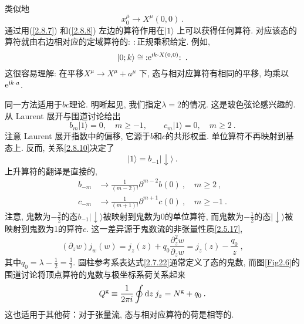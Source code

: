 类似地
\begin{equation}\label{2.8.8}
x_{0}^{\mu} \rightarrow X^{\mu}(0,0) \:.
\end{equation}
通过用(\ref{2.8.7}) 和(\ref{2.8.8}) 左边的算符作用在$|1\rangle$ 上可以获得任何算符. 
对应该态的算符就由右边相对应的定域算符的$\mathrel{:\::}$正规乘积给定. 例如,
\begin{equation}
\lvert 0 ; k\rangle \cong \: : \mathrel{\mathrm{e}^{\mathrm{i} k \cdot X(0,0)}}: \:. \label{2.8.9}
\end{equation}
这很容易理解: 在平移$X^{\mu} \rightarrow X^{\mu}+a^{\mu}$ 下, 态与相对应算符有相同的平移, 均乘以$\mathrm{e} ^{\mathrm{i} k\cdot a}$. 

同一方法适用于$bc$理论. 明晰起见, 我们指定$\lambda=2$的情况. 这是玻色弦论感兴趣的. 从 Laurent 展开与围道讨论给出
\begin{equation}\label{2.8.10}
b_{m}|1\rangle=0, \quad m \geq-1, \qquad c_{m}|1\rangle=0, \quad m \geq 2 \:.
\end{equation}
注意 Laurent 展开指数中的偏移, 它源于$b$和$c$的共形权重. 单位算符不再映射到基态上. 反而, 关系\eqref{2.8.10}决定了
\begin{equation}
\lvert 1\rangle=b_{-1}\lvert \downarrow\rangle \:. \label{2.8.11}
\end{equation}
上升算符的翻译是直接的,
\begin{subequations} \label{2.8.12}
\begin{align}
b_{-m} &\rightarrow \frac{1}{(m-2) !} \partial^{m-2} b(0)\:, \quad m \geq 2 \:, \label{2.8.12a}  \\
c_{-m} &\rightarrow \frac{1}{(m+1) !} \partial^{m+1} c(0)\:, \quad m \geq-1 \:. \label{2.8.12b}
\end{align}
\end{subequations}
注意, 鬼数为$-\frac{3}{2}$的态$b_{-1}\lvert \downarrow\rangle$被映射到鬼数为0的单位算符, 而鬼数为$-\frac{1}{2}$的态$\lvert \downarrow\rangle$被映射到鬼数为1的算符$c$. 这一差异源于鬼数流的非张量性质\eqref{2.5.17},
\begin{equation}
(\partial_{z} w) j_{w}(w)=j_{z}(z)+q_{0} \frac{\partial_{z}^{2} w}{\partial_{z} w}=j_{z}(z)-\frac{q_{0}}{z} \:, \label{2.8.13}
\end{equation}
其中$q_{0}=\lambda-\frac{1}{2}=\frac{3}{2}$. 圆柱参考系表达式\eqref{2.7.22}通常定义了态的鬼数, 而图\ref{Fig2.6}的围道讨论将顶点算符的鬼数与极坐标系荷关系起来
\begin{equation}
Q^{\mathrm{g}} \equiv \frac{1}{2 \pi i} \oint \mathrm{d} z\: j_{z}=N^{\mathrm{g}}+q_{0} \:.\label{2.8.14}
\end{equation}
这也适用于其他荷：对于张量流, 态与相对应算符的荷是相等的.

